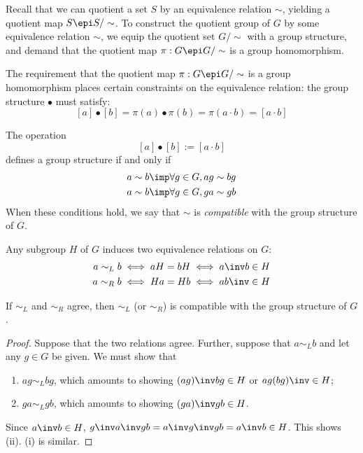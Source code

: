 \documentclass{amsart}
\begin{document}
Recall that we can quotient a set $S$ by an equivalence relation $\sim$, yielding a quotient map $S \epi S/\sim$.
To construct the quotient group of $G$ by some equivalence relation $\sim$, we equip the quotient set $G/\sim$ with a group structure, and demand that the quotient map $\pi : G \epi G/\sim$ is a group homomorphism.

The requirement that the quotient map $\pi : G \epi G/\sim$ is a group homomorphism places certain constraints on the equivalence relation: the group structure $\bullet$ must satisfy:
\[
  [a] \bullet [b] = \pi(a) \bullet \pi(b) = \pi(a \cdot b) = [a \cdot b]
\]
\begin{lem}
  The operation
  \[
    [a] \bullet [b] := [a \cdot b]
  \]
  defines a group structure if and only if
  \begin{align}
    a \sim b &\imp \forall g \in G, ag \sim bg\\
    a \sim b &\imp \forall g \in G, ga \sim gb
  \end{align}
  When these conditions hold, we say that $\sim$ is \emph{compatible} with the group structure of $G$.
\end{lem}

Any subgroup $H$ of $G$ induces two equivalence relations on $G$:
\begin{align}
  a \sim_{L} b &\iff aH = bH \iff a\inv b \in H\\
  a \sim_{R} b &\iff Ha = Hb \iff ab\inv \in H
\end{align}

\begin{lem}\label{lem:agree-group-struct}
  If $\sim_{L}$ and $\sim_{R}$ agree, then $\sim_{L}$ (or $\sim_{R}$) is compatible with the group structure of $G$.
\end{lem}
\begin{proof}
  Suppose that the two relations agree.
  Further, suppose that $a \sim_{L} b$ and let any $g \in G$ be given.
  We must show that
  \begin{enumerate}
  \item $ag \sim_{L} bg$, which amounts to showing $(ag)\inv bg \in H$ or $ag(bg)\inv \in H$;
  \item $ga \sim_{L} gb$, which amounts to showing $(ga)\inv gb \in H$.
  \end{enumerate}
  Since $a\inv b \in H$, $g\inv a\inv gb = a\inv g\inv gb = a\inv b \in H$.
  This shows (ii).
  (i) is similar.
\end{proof}
\end{document}
